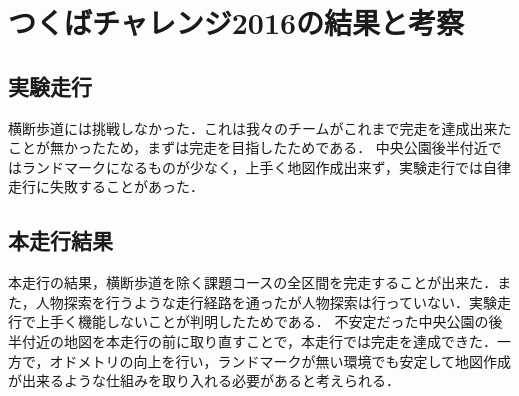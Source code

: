\documentclass[10pt,a4paper]{jarticle}
\begin{document}
\section{つくばチャレンジ2016の結果と考察}
\subsection{実験走行}
横断歩道には挑戦しなかった．これは我々のチームがこれまで完走を達成出来たことが無かったため，まずは完走を目指したためである．
中央公園後半付近ではランドマークになるものが少なく，上手く地図作成出来ず，実験走行では自律走行に失敗することがあった．

\subsection{本走行結果}
本走行の結果，横断歩道を除く課題コースの全区間を完走することが出来た．また，人物探索を行うような走行経路を通ったが人物探索は行っていない．実験走行で上手く機能しないことが判明したためである．
不安定だった中央公園の後半付近の地図を本走行の前に取り直すことで，本走行では完走を達成できた．一方で，オドメトリの向上を行い，ランドマークが無い環境でも安定して地図作成が出来るような仕組みを取り入れる必要があると考えられる．
\end{document}
